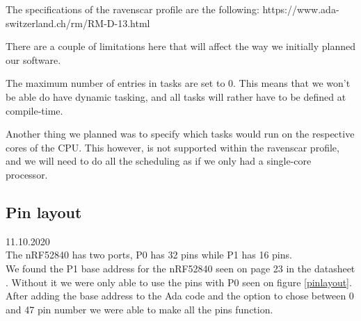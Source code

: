 \documentclass{article}
\begin{document}
The specifications of the ravenscar profile are the following:
https://www.ada-switzerland.ch/rm/RM-D-13.html

There are a couple of limitations here that will affect the way we initially planned our software.

The maximum number of entries in tasks are set to 0. This means that we won't be able do have dynamic tasking, and all tasks will rather have to be defined at compile-time.

Another thing we planned was to specify which tasks would run on the respective cores of the CPU. This however, is not supported within the ravenscar profile, and we will need to do all the scheduling as if we only had a single-core processor.

\subsection{Pin layout}
11.10.2020\\
The nRF52840 has two ports, P0 has 32 pins while P1 has 16 pins.\\
We found the P1 base address for the nRF52840 seen on page 23 in the datasheet \cite{NRF52840}. Without it we were only able to use the pins with P0 seen on figure \ref{pinlayout}. After adding the base address to the Ada code and the option to chose between 0 and 47 pin number we were able to make all the pins function.
\end{document}
